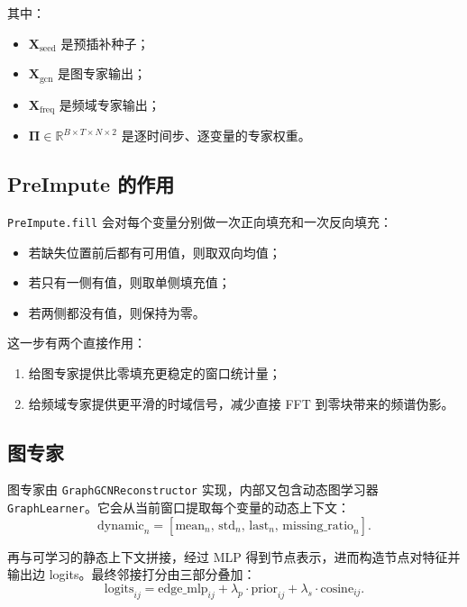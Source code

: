 \documentclass[UTF8]{ctexart}
\newcommand{\code}[1]{\texttt{#1}}
\begin{document}
其中：
\begin{itemize}
    \item \(\bm{X}_{\text{seed}}\) 是预插补种子；
    \item \(\bm{X}_{\text{gcn}}\) 是图专家输出；
    \item \(\bm{X}_{\text{freq}}\) 是频域专家输出；
    \item \(\bm{\Pi}\in\mathbb{R}^{B\times T\times N\times 2}\) 是逐时间步、逐变量的专家权重。
\end{itemize}

\subsection{PreImpute 的作用}

\code{PreImpute.fill} 会对每个变量分别做一次正向填充和一次反向填充：
\begin{itemize}
    \item 若缺失位置前后都有可用值，则取双向均值；
    \item 若只有一侧有值，则取单侧填充值；
    \item 若两侧都没有值，则保持为零。
\end{itemize}

这一步有两个直接作用：
\begin{enumerate}
    \item 给图专家提供比零填充更稳定的窗口统计量；
    \item 给频域专家提供更平滑的时域信号，减少直接 FFT 到零块带来的频谱伪影。
\end{enumerate}

\subsection{图专家}

图专家由 \code{GraphGCNReconstructor} 实现，内部又包含动态图学习器 \code{GraphLearner}。它会从当前窗口提取每个变量的动态上下文：
\begin{equation}
    \text{dynamic}_n =
    \left[
    \text{mean}_n,\,
    \text{std}_n,\,
    \text{last}_n,\,
    \text{missing\_ratio}_n
    \right].
\end{equation}

再与可学习的静态上下文拼接，经过 MLP 得到节点表示，进而构造节点对特征并输出边 logits。最终邻接打分由三部分叠加：
\begin{equation}
    \text{logits}_{ij}
    =
    \text{edge\_mlp}_{ij}
    + \lambda_p \cdot \text{prior}_{ij}
    + \lambda_s \cdot \text{cosine}_{ij}.
\end{equation}
\end{document}
